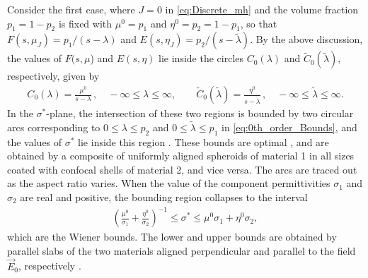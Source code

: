 \documentclass[11pt]{amsart}
\begin{document}
Consider the first case, where $J=0$  in \eqref{eq:Discrete_mh} and the
volume fraction $p_1=1-p_2$ is fixed with $\mu^0=p_1$ and
$\eta^0=p_2=1-p_1$, so that $F(s,\mu_J)=p_1/(s-\lambda)$ and
$E(s,\eta_J)=p_2/(s-\tilde{\lambda})$. By the above discussion, the values of 
$F(s,\mu$) and $E(s,\eta)$ lie inside the circles $C_0(\lambda)$ and
$\tilde{C}_0(\tilde{\lambda})$, respectively, given by  
%
\begin{align}\label{eq:0th_order_Bounds}
    C_0(\lambda)=\frac{\mu^0}{s-\lambda}\,, \quad -\infty\leq\lambda\leq \infty, \qquad
    \tilde{C}_0(\tilde{\lambda})=\frac{\eta^0}{s-\tilde{\lambda}}\,, \quad
    -\infty\leq\tilde{\lambda}\leq \infty. 
\end{align}
%
In the $\sigma^*$-plane, the intersection of these two regions is bounded by
two circular arcs corresponding to $0\leq\lambda\leq p_2$ and $0\leq\tilde{\lambda}\leq p_1$
in \eqref{eq:0th_order_Bounds}, and the values of $\sigma^*$ lie inside
this region \cite{Golden:1986:BCP}. These bounds are optimal
\cite{Milton:JAP-5286,Bergman:AP-78}, and are obtained by a composite
of uniformly aligned spheroids of material 1 in all sizes coated with
confocal shells of material 2, and vice versa. The arcs are traced out
as the aspect ratio varies. When the value of the component
permittivities $\sigma_1$ and $\sigma_2$ are real and positive, the bounding
region collapses to the interval
%
\begin{align}\label{eq:Wiener_bounds}
  \left(\frac{\mu^0}{\sigma_1}+\frac{\eta^0}{\sigma_2}\right)^{-1}\leq\sigma^*\leq \mu^0\sigma_1+\eta^0\sigma_2,
\end{align}
%
 which are the Wiener
bounds. The lower and upper bounds are obtained by parallel slabs of
the two materials aligned perpendicular and parallel to the field
$\vec{E}_0$, respectively \cite{Scaife-1989}.
\end{document}
